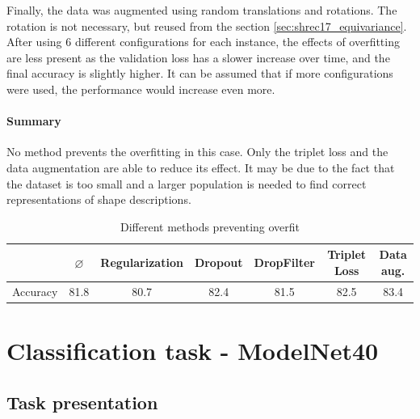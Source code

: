 \documentclass[11pt]{report}
\begin{document}
Finally, the data was augmented using random translations and rotations. The rotation is not necessary, but reused from the section \ref{sec:shrec17_equivariance}. After using 6 different configurations for each instance, the effects of overfitting are less present as the validation loss has a slower increase over time, and the final accuracy is slightly higher. It can be assumed that if more configurations were used, the performance would increase even more.

\paragraph*{Summary}
No method prevents the overfitting in this case. Only the triplet loss and the data augmentation are able to reduce its effect. It may be due to the fact that the dataset is too small and a larger population is needed to find correct representations of shape descriptions.

\begin{table}[!ht]
    \centering
    \begin{tabular}{c|cccccc}
 & $\varnothing$ & Regularization & Dropout & DropFilter & Triplet Loss & Data aug.\\ \hline
Accuracy & 81.8 & 80.7 & 82.4 & 81.5 & 82.5 & 83.4\\
    \end{tabular}
    \caption{Different methods preventing overfit}
    \label{tab:shrec17_overfit}
\end{table}


\section{Classification task - ModelNet40}\label{task:mn40}
\subsection{Task presentation}
\end{document}
